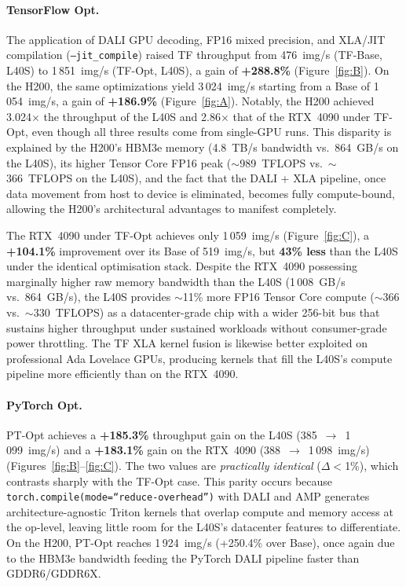 \paragraph{TensorFlow Opt.}
The application of DALI GPU decoding, FP16 mixed precision, and
XLA/JIT compilation (\texttt{--jit\_compile}) raised TF throughput from
476~img/s (TF-Base, L40S) to 1\,851~img/s (TF-Opt, L40S), a gain of
\textbf{+288.8\%} (Figure~\ref{fig:B}).  On the H200, the same
optimizations yield 3\,024~img/s starting from a Base of 1\,054~img/s,
a gain of \textbf{+186.9\%} (Figure~\ref{fig:A}).  Notably, the H200
achieved 3.024$\times$ the throughput of the L40S and 2.86$\times$ that
of the RTX~4090 under TF-Opt, even though all three results come from
single-GPU runs.  This disparity is explained by the H200's HBM3e
memory (4.8~TB/s bandwidth vs.\ 864~GB/s on the L40S), its higher
Tensor Core FP16 peak (${\sim}$989~TFLOPS vs.\ ${\sim}$366~TFLOPS on
the L40S), and the fact that the DALI + XLA pipeline, once data
movement from host to device is eliminated, becomes fully
compute-bound, allowing the H200's architectural advantages to
manifest completely.

The RTX~4090 under TF-Opt achieves only 1\,059~img/s (Figure~\ref{fig:C}),
a \textbf{+104.1\%} improvement over its Base of 519~img/s, but
\textbf{43\% less} than the L40S under the identical optimisation
stack.  Despite the RTX~4090 possessing marginally higher raw memory
bandwidth than the L40S (1\,008~GB/s vs.\ 864~GB/s), the L40S provides
${\sim}$11\% more FP16 Tensor Core compute (${\sim}$366 vs.\
${\sim}$330~TFLOPS) as a datacenter-grade chip with a wider 256-bit bus
that sustains higher throughput under sustained workloads without
consumer-grade power throttling.  The TF XLA kernel fusion is likewise
better exploited on professional Ada Lovelace GPUs, producing kernels
that fill the L40S's compute pipeline more efficiently than on the
RTX~4090.

\paragraph{PyTorch Opt.}
PT-Opt achieves a \textbf{+185.3\%} throughput gain on the L40S
(385~$\to$~1\,099~img/s) and a \textbf{+183.1\%} gain on the RTX~4090
(388~$\to$~1\,098~img/s) (Figures~\ref{fig:B}--\ref{fig:C}).  The two
values are \emph{practically identical} ($\Delta <$1\%), which contrasts
sharply with the TF-Opt case.  This parity occurs because
\texttt{torch.compile(mode=``reduce-overhead'')} with DALI and AMP
generates architecture-agnostic Triton kernels that overlap compute and
memory access at the op-level, leaving little room for the L40S's
datacenter features to differentiate.  On the H200, PT-Opt reaches
1\,924~img/s (+250.4\% over Base), once again due to the HBM3e
bandwidth feeding the PyTorch DALI pipeline faster than GDDR6/GDDR6X.

